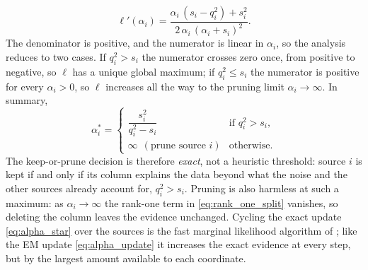 \documentclass{article}
\begin{document}
\begin{equation}
    \ell'(\alpha_i) = \frac{\alpha_i\,(s_i - q_i^2) + s_i^2}{2\,\alpha_i\,(\alpha_i + s_i)^2}. \label{eq:ell_prime}
\end{equation}
The denominator is positive, and the numerator is linear in $\alpha_i$, so the analysis reduces to two cases. If $q_i^2 > s_i$ the numerator crosses zero once, from positive to negative, so $\ell$ has a unique global maximum; if $q_i^2 \le s_i$ the numerator is positive for every $\alpha_i > 0$, so $\ell$ increases all the way to the pruning limit $\alpha_i \to \infty$. In summary,
\begin{equation}
    \alpha_i^* = \begin{cases} \dfrac{s_i^2}{q_i^2 - s_i} & \text{if } q_i^2 > s_i, \\[2ex] \infty \ \ (\text{prune source } i) & \text{otherwise}. \end{cases} \label{eq:alpha_star}
\end{equation}
The keep-or-prune decision is therefore \emph{exact}, not a heuristic threshold: source $i$ is kept if and only if its column explains the data beyond what the noise and the other sources already account for, $q_i^2 > s_i$. Pruning is also harmless at such a maximum: as $\alpha_i \to \infty$ the rank-one term in \eqref{eq:rank_one_split} vanishes, so deleting the column leaves the evidence unchanged. Cycling the exact update \eqref{eq:alpha_star} over the sources is the fast marginal likelihood algorithm of \cite{tipping2003fast}; like the EM update \eqref{eq:alpha_update} it increases the exact evidence at every step, but by the largest amount available to each coordinate.
\end{document}
